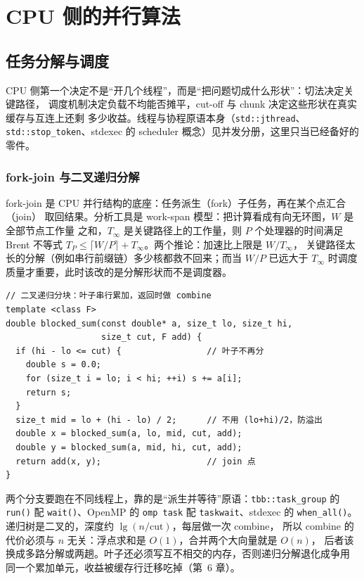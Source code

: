 \documentclass[12pt,a4paper,fontset=fandol]{ctexbook}
\newcommand{\Fn}[1]{\texttt{#1()}}
\newcommand{\Tp}[1]{\texttt{#1}}
\begin{document}
\part{CPU 侧的并行算法}

\chapter{任务分解与调度}

CPU 侧第一个决定不是``开几个线程''，而是``把问题切成什么形状''：切法决定关键路径，
调度机制决定负载不均能否摊平，cut-off 与 chunk 决定这些形状在真实缓存与互连上还剩
多少收益。线程与协程原语本身（\Tp{std::jthread}、\Tp{std::stop\_token}、stdexec 的
scheduler 概念）见并发分册，这里只当已经备好的零件。

\section{fork-join 与二叉递归分解}

fork-join 是 CPU 并行结构的底座：任务派生（fork）子任务，再在某个点汇合（join）
取回结果。分析工具是 work-span 模型：把计算看成有向无环图，$W$ 是全部节点工作量
之和，$T_\infty$ 是关键路径上的工作量，则 $P$ 个处理器的时间满足 Brent 不等式
$T_P \le \lceil W/P \rceil + T_\infty$。两个推论：加速比上限是 $W/T_\infty$，
关键路径太长的分解（例如串行前缀链）多少核都救不回来；而当 $W/P$ 已远大于
$T_\infty$ 时调度质量才重要，此时该改的是分解形状而不是调度器。

\begin{lstlisting}[style=cppstyle,caption={带 cut-off 的二叉递归分块求和}]
// 二叉递归分块：叶子串行累加，返回时做 combine
template <class F>
double blocked_sum(const double* a, size_t lo, size_t hi,
                   size_t cut, F add) {
  if (hi - lo <= cut) {                 // 叶子不再分
    double s = 0.0;
    for (size_t i = lo; i < hi; ++i) s += a[i];
    return s;
  }
  size_t mid = lo + (hi - lo) / 2;      // 不用 (lo+hi)/2，防溢出
  double x = blocked_sum(a, lo, mid, cut, add);
  double y = blocked_sum(a, mid, hi, cut, add);
  return add(x, y);                     // join 点
}
\end{lstlisting}

两个分支要跑在不同线程上，靠的是``派生并等待''原语：\Tp{tbb::task\_group} 的
\Fn{run} 配 \Fn{wait}、OpenMP 的 \Tp{omp task} 配 \Tp{taskwait}、stdexec 的
\Fn{when\_all}。递归树是二叉的，深度约 $\lg(n/\text{cut})$，每层做一次 combine，
所以 combine 的代价必须与 $n$ 无关：浮点求和是 $O(1)$，合并两个大向量就是 $O(n)$，
后者该换成多路分解或两趟。叶子还必须写互不相交的内存，否则递归分解退化成争用
同一个累加单元，收益被缓存行迁移吃掉（第~6 章）。
\end{document}
